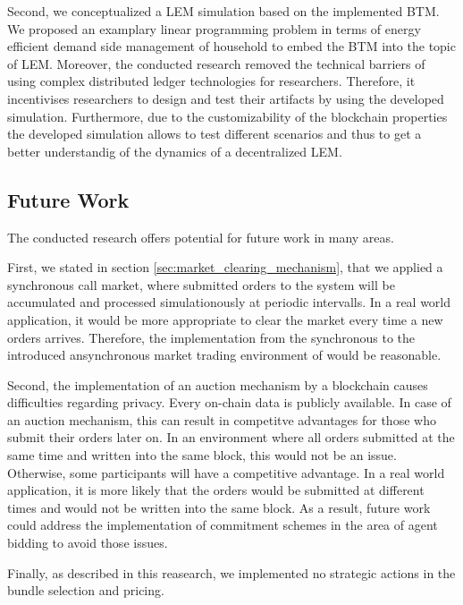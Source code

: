 Second, we conceptualized a LEM simulation based on the implemented
BTM. We proposed an examplary linear programming problem in terms of energy efficient 
demand side management of household to embed the BTM into the topic of LEM.
Moreover, the conducted research removed the technical barriers of using complex 
distributed ledger technologies for researchers.
Therefore, it incentivises researchers 
to design and test their artifacts by using the developed simulation.
Furthermore, due to the customizability of the blockchain properties 
the developed simulation allows to test different scenarios and thus to get a
better understandig of the dynamics of a decentralized LEM.

\subsection{Future Work}
The conducted research offers potential for future work in many areas.

First, we stated in section \ref{sec:market_clearing_mechanism}, that we
applied a synchronous call market, where submitted orders to the system
will be accumulated and processed simulationously at periodic intervalls.
In a real world application, it would be more appropriate to clear 
the market every time a new orders arrives. Therefore,
the implementation from the synchronous to the introduced ansynchronous market trading 
environment of  would be reasonable. 

Second, the implementation of an 
auction mechanism by a blockchain causes 
difficulties regarding privacy. Every on-chain data 
is publicly available. 
In case of an auction mechanism, this can result in competitve advantages
for those who submit their orders later on. 
In an environment where all orders submitted at the same time and written 
into the same block, this would not be an issue. 
Otherwise, some participants will have a competitive advantage.
In a real world application, it is more likely that the orders would be submitted at different
times and would not be written into the same block. 
As a result, future work could address the implementation of commitment schemes
in the area of agent bidding to avoid those issues.

Finally, as described in this reasearch, we implemented no strategic
actions in the bundle selection and pricing. 







